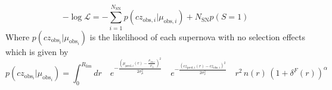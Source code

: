\begin{equation}
    \boxed{ - \log \mathcal{L} =  - \sum_{i=1}^{N_\text{SN}} p(cz_{\text{obs},i}|\mu_{\text{obs},i}) + N_\text{SN}p(S=1)}
    \label{eqn:borg_pv_L}
\end{equation}
Where $p(cz_{\text{obs}_i}|\mu_{\text{obs}_i})$ is the likelihood of each supernova with no selection effects which is given by
\begin{equation}
    \boxed{p(cz_{\text{obs}_i}|\mu_{\text{obs}_i}) = \int_{0}^{R_{\text{lim}}} dr \quad e^{- \frac{\left(\mu_{\text{pred},i}(r) -\frac{\mu_{\text{obs},i}}{\mu_A} \right)^2}{2\sigma_{\mu}^2} } 
    \quad e^{-\frac{(cz_{\text{pred},i}(r) - cz_{\text{obs},i})^2}{2 \sigma_v^2}} \quad r^2\, n(r)\,(1+\delta^F(r))^{\alpha}}
\end{equation}